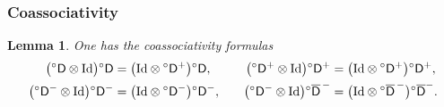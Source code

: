 \documentclass[10pt, reqno]{amsart}
\numberwithin{subsection}{section}
\numberwithin{subsubsection}{subsection}
\numberwithin{equation}{section} %
\theoremstyle{mystyle}
\newtheorem{lem}[thm]{\hspace{-0.14cm}  {Lemma} }%
\theoremstyle{mystyle2}
\theoremstyle{mystyle3}
\newcommand{\sfD}{\mathsf{D}}
\newcommand{\ssk}{\smallskip}
\begin{document}


\subsubsection{Coassociativity}

\begin{lem}\label{proof of coassociativity of sfD}
One has the coassociativity formulas
$$
\begin{aligned}
\big({^\circ}\sfD\otimes\text{\rm Id}\big){^\circ}\sfD &= \big(\text{\rm Id}\otimes{^\circ}\sfD^+\big){^\circ}\sfD,   
&\big({^\circ}\sfD^+\otimes\text{\rm Id}\big){^\circ}\sfD^+ &= \big(\text{\rm Id}\otimes{^\circ}\sfD^+\big){^\circ}\sfD^+,   \\
\big({^\circ}\sfD^-\otimes\text{\rm Id}\big){^\circ}\sfD^- &= \big(\text{\rm Id}\otimes {^\circ}\sfD^-\big){^\circ}\sfD^-,   \quad
&\big({^\circ}\sfD^-\otimes\text{\rm Id}\big){^\circ}\overline{\sfD}^{\,-} 
&= \big(\text{\rm Id}\otimes {^\circ}\overline{\sfD}^{\,-}\big){^\circ}\overline{\sfD}^-.
\end{aligned}
$$
\end{lem}

\ssk
\end{document}
